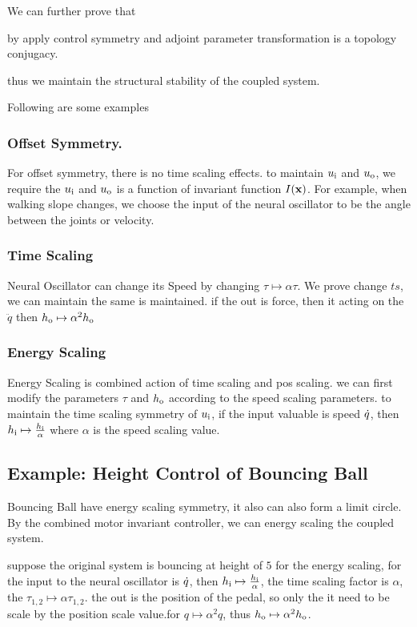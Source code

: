 We can further prove that
\begin{mythe}
by apply control symmetry and adjoint parameter transformation is a topology conjugacy.
\end{mythe}
thus we maintain the structural stability of the coupled system.

Following are some examples


\subsubsection*{ Offset Symmetry.}
For offset symmetry, there is no time scaling effects.
to maintain $u_{\mathrm{i}}$ and $u_{\mathrm{o}}$, we require the $u_{\mathrm{i}}$ and $u_{\mathrm{o}}$ is a function of invariant function $I(\mathbf{x})$.
For example, when walking slope changes, we choose the input of the neural oscillator to be the angle between the joints or velocity.



\subsubsection*{Time Scaling}
Neural Oscillator can change its Speed by changing $\tau \mapsto \alpha \tau $.
We prove change $ts$, we can maintain the same is maintained.
if the out is force, then it acting on the $\ddot{q}$
then $h_{\mathrm{o}} \mapsto \alpha^2 h_{\mathrm{o}}$

\subsubsection*{ Energy Scaling}
Energy Scaling is combined action of time scaling and pos scaling.
we can first modify the parameters $\tau$ and $h_{\mathrm{o}}$ according to the speed scaling parameters.
to maintain the time scaling symmetry of $u_{\mathrm{i}}$, if the input valuable is speed $\dot{q}$, 
then $h_{\mathrm{i}} \mapsto \frac{h_{\mathrm{i}}}{\alpha}$ where $\alpha$ is the speed scaling value.




\subsection{Example: Height Control of Bouncing Ball}

Bouncing Ball have energy scaling symmetry, it also can also form a limit circle.
By the combined motor invariant controller, we can energy scaling the coupled system.

suppose the original system is bouncing at height of $5$
for the energy scaling, for the input to the neural oscillator is $\dot{q}$,
then $h_{\mathrm{i}} \mapsto \frac{h_{\mathrm{i}}}{\alpha}$, the time scaling factor is $\alpha$, the $\tau_{1,2} \mapsto \alpha \tau_{1,2}$.
the out is the position of the pedal, so only the it need to be scale by the position scale value.for $q \mapsto \alpha^2q$,
thus $h_{\mathrm{o}} \mapsto \alpha^2 h_{\mathrm{o}}$.

